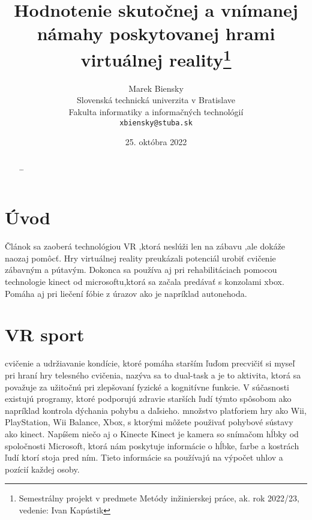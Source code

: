 \documentclass[10pt,oneside,slovak,a4paper]{article}
\title{Hodnotenie skutočnej a vnímanej námahy poskytovanej hrami virtuálnej reality\thanks{Semestrálny projekt v predmete Metódy inžinierskej práce, ak. rok 2022/23, vedenie: Ivan Kapústik}}
\author{Marek Biensky\\[2pt]
	{\small Slovenská technická univerzita v Bratislave}\\
	{\small Fakulta informatiky a informačných technológií}\\
	{\small \texttt{xbiensky@stuba.sk}}
	}
\date{\small 25. októbra 2022}
\begin{document}
\maketitle

\begin{abstract}
\ldots
\end{abstract}

\section{Úvod}
Článok sa zaoberá technológiou VR ,ktorá neslúži len na zábavu ,ale dokáže naozaj pomôcť.
Hry virtuálnej reality preukázali potenciál urobiť cvičenie zábavným a pútavým.
Dokonca sa používa aj pri rehabilitáciach pomocou technologie kinect od microsoftu,ktorá sa začala predávať s konzolami xbox.
Pomáha aj pri liečení fóbie z úrazov ako je napríklad autonehoda.


\section{VR sport} \label{VR sport}

cvičenie a udržiavanie kondície, ktoré pomáha starším ľuďom precvičiť si myseľ pri hraní hry
telesného cvičenia, nazýva sa to dual-task a je to aktivita, ktorá sa považuje za užitočnú pri zlepšovaní
fyzické a kognitívne funkcie.
V súčasnosti existujú programy, ktoré podporujú zdravie starších ľudí týmto spôsobom ako napríklad kontrola dýchania pohybu a daľsieho. množstvo platforiem
hry ako Wii, PlayStation, Wii Balance, Xbox, s ktorými môžete použivať pohybové sústavy ako kinect.
Napíšem niečo aj o Kinecte
Kinect je kamera so snímačom hĺbky od spoločnosti Microsoft, ktorá nám poskytuje informácie o hĺbke, farbe a kostrách ľudí
ktorí stoja pred ním. Tieto informácie sa používajú na výpočet uhlov a pozícií každej osoby.


\end{document}
